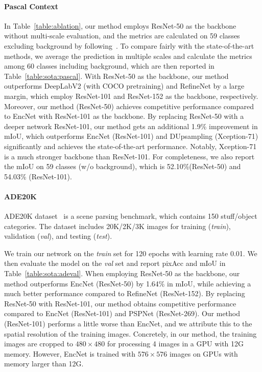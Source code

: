 \documentclass[10pt,twocolumn,letterpaper]{article}
\begin{document}
\paragraph{Pascal Context}
In Table~\ref{table:ablation}, our method employs ResNet-50 as the backbone without multi-scale evaluation, and the metrics are calculated on 59 classes excluding background by following~\cite{zhang2018context}.
To compare fairly with the state-of-the-art methods, we average the prediction in multiple scales and calculate the metrics among 60 classes including background, which are then reported in Table~\ref{table:sota:pascal}.
With ResNet-50 as the backbone, our method outperforms DeepLabV2 (with COCO pretraining) and RefineNet by a large margin, which employ ResNet-101 and ResNet-152 as the backbone, respectively.
Moreover, our method (ResNet-50) achieves competitive performance compared to EncNet with ResNet-101 as the backbone.
By replacing ResNet-50 with a deeper network ResNet-101, our method gets an additional 1.9\% improvement in mIoU, which outperforms EncNet (ResNet-101) and DUpsampling (Xception-71) significantly and achieves the state-of-the-art performance.
Notably, Xception-71 is a much stronger backbone than ResNet-101.
For completeness, we also report the mIoU on 59 classes (w/o background), which is 52.10\%(ResNet-50) and 54.03\% (ResNet-101).
\vspace{-1em}
\paragraph{ADE20K}
ADE20K dataset~\cite{zhou2017scene} is a scene parsing benchmark, which contains 150 stuff/object categories.
The dataset includes 20K/2K/3K images for training (\textit{train}), validation (\textit{val}), and testing (\textit{test}).

We train our network on the \textit{train} set for 120 epochs with learning rate 0.01.
We then evaluate the model on the \textit{val} set and report pixAcc and mIoU in Table~\ref{table:sota:adeval}.
When employing ResNet-50 as the backbone, our method outperforms EncNet (ResNet-50) by 1.64\% in mIoU, while achieving a much better performance compared to RefineNet (ResNet-152).
By replacing ResNet-50 with ResNet-101, our method obtains competitive performance compared to EncNet (ResNet-101) and PSPNet (ResNet-269).
Our method (ResNet-101) performs a little worse than EncNet, and we attribute this to the spatial resolution of the training images.
Concretely, in our method, the training images are cropped to $480\times 480$ for processing 4 images in a GPU with 12G memory.
However, EncNet is trained with $576\times 576$ images on GPUs with memory larger than 12G.
\end{document}
